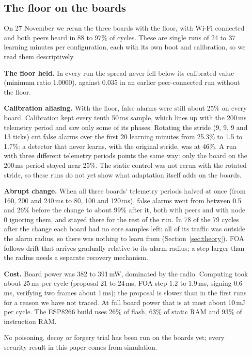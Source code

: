 \subsection{The floor on the boards}\label{sec:hw27}
On 27 November we reran the three boards with the floor, with Wi-Fi connected and both peers heard in
88 to 97\% of cycles. These are single runs of 24 to 37 learning minutes per configuration, each with
its own boot and calibration, so we read them descriptively.

\textbf{The floor held.} In every run the spread never fell below its calibrated value (minimum ratio
1.0000), against 0.035 in an earlier peer-connected run without the floor.

\textbf{Calibration aliasing.} With the floor, false alarms were still about 25\% on every board.
Calibration kept every tenth 50\,ms sample, which lines up with the 200\,ms telemetry period and saw
only some of its phases. Rotating the stride (9, 9, 9 and 13 ticks) cut false alarms over the first 20
learning minutes from 25.3\% to 1.5 to 1.7\%; a detector that never learns, with the original stride,
was at 46\%. A run with three different telemetry periods points the same way: only the board on the
200\,ms period stayed near 25\%. The static control was not rerun with the rotated stride, so these runs
do not yet show what adaptation itself adds on the boards.

\textbf{Abrupt change.} When all three boards' telemetry periods halved at once (from 160, 200 and
240\,ms to 80, 100 and 120\,ms), false alarms went from between 0.5 and 26\% before the change to about
99\% after it, both with peers and with node 0 ignoring them, and stayed there for the rest of the run.
In 78 of the 79 cycles after the change each board had no core samples left: all of its traffic was
outside the alarm radius, so there was nothing to learn from (Section~\ref{sec:theory}). FOA follows
drift that arrives gradually relative to its alarm radius; a step larger than the radius needs a
separate recovery mechanism.

\textbf{Cost.} Board power was 382 to 391\,mW, dominated by the radio. Computing took about 25\,ms per
cycle (proposal 21 to 24\,ms, FOA step 1.2 to 1.9\,ms, signing 0.6\,ms, verifying two frames about
1\,ms); the proposal is slower than in the first runs for a reason we have not traced. At full board
power that is at most about 10\,mJ per cycle. The ESP8266 build uses 26\% of flash, 63\% of static RAM
and 93\% of instruction RAM.

No poisoning, decoy or forgery trial has been run on the boards yet; every security result in this
paper comes from simulation.

